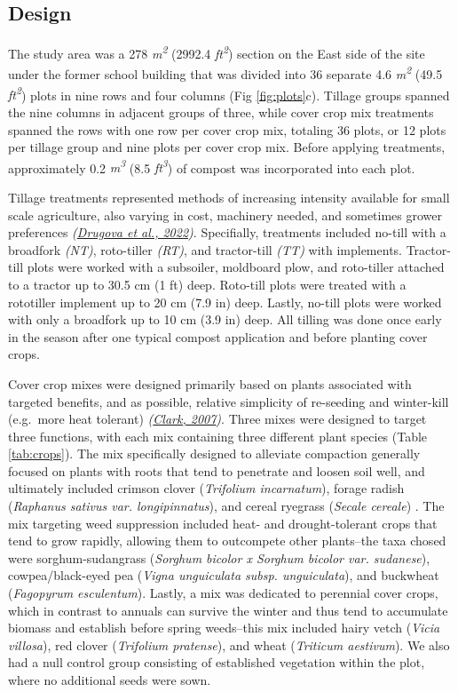 \documentclass[
  12pt,
]{article}
\begin{document}
\hypertarget{design}{%
\subsection{Design}\label{design}}

The study area was a 278 \emph{m\textsuperscript{2}} (2992.4 \emph{ft\textsuperscript{2}}) section on the East side of the site under the former school building that was divided into 36 separate 4.6 \emph{m\textsuperscript{2}} (49.5 \emph{ft\textsuperscript{2}}) plots in nine rows and four columns (Fig \ref{fig:plots}c).
Tillage groups spanned the nine columns in adjacent groups of three, while cover crop mix treatments spanned the rows with one row per cover crop mix, totaling 36 plots, or 12 plots per tillage group and nine plots per cover crop mix.
Before applying treatments, approximately 0.2 \emph{m\textsuperscript{3}} (8.5 \emph{ft\textsuperscript{3}}) of compost was incorporated into each plot.

Tillage treatments represented methods of increasing intensity available for small scale agriculture, also varying in cost, machinery needed, and sometimes grower preferences \emph{(\protect\hyperlink{ref-drugova22}{Drugova et al., 2022})}.
Specifially, treatments included no-till with a broadfork \emph{(NT)}, roto-tiller \emph{(RT)}, and tractor-till \emph{(TT)} with implements.
Tractor-till plots were worked with a subsoiler, moldboard plow, and roto-tiller attached to a tractor up to 30.5 cm (1 ft) deep.
Roto-till plots were treated with a rototiller implement up to 20 cm (7.9 in) deep.
Lastly, no-till plots were worked with only a broadfork up to 10 cm (3.9 in) deep.
All tilling was done once early in the season after one typical compost application and before planting cover crops.

Cover crop mixes were designed primarily based on plants associated with targeted benefits, and as possible, relative simplicity of re-seeding and winter-kill (e.g.~more heat tolerant) \emph{(\protect\hyperlink{ref-clark07}{Clark, 2007})}.
Three mixes were designed to target three functions, with each mix containing three different plant species (Table \ref{tab:crops}).
The mix specifically designed to alleviate compaction generally focused on plants with roots that tend to penetrate and loosen soil well, and ultimately included
crimson clover (\emph{Trifolium incarnatum}),
forage radish (\emph{Raphanus sativus var. longipinnatus}), and
cereal ryegrass (\emph{Secale cereale})
.
The mix targeting weed suppression included heat- and drought-tolerant crops that tend to grow rapidly, allowing them to outcompete other plants--the taxa chosed were
sorghum-sudangrass (\emph{Sorghum bicolor x Sorghum bicolor var. sudanese}),
cowpea/black-eyed pea (\emph{Vigna unguiculata subsp. unguiculata}), and
buckwheat (\emph{Fagopyrum esculentum}).
Lastly, a mix was dedicated to perennial cover crops, which in contrast to annuals can survive the winter and thus tend to accumulate biomass and establish before spring weeds--this mix included
hairy vetch (\emph{Vicia villosa}),
red clover (\emph{Trifolium pratense}), and
wheat (\emph{Triticum aestivum}).
We also had a null control group consisting of established vegetation within the plot, where no additional seeds were sown.
\end{document}
